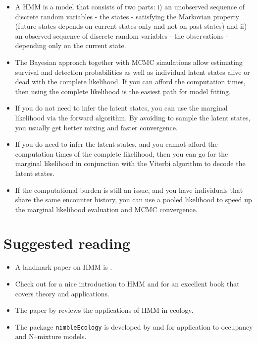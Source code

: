 \documentclass[
  12pt,
]{krantz}
\begin{document}
\begin{itemize}
\item
  A HMM is a model that consists of two parts: i) an unobserved sequence of discrete random variables - the states - satisfying the Markovian property (future states depends on current states only and not on past states) and ii) an observed sequence of discrete random variables - the observations - depending only on the current state.
\item
  The Bayesian approach together with MCMC simulations allow estimating survival and detection probabilities as well as individual latent states alive or dead with the complete likelihood. If you can afford the computation times, then using the complete likelihood is the easiest path for model fitting.
\item
  If you do not need to infer the latent states, you can use the marginal likelihood via the forward algorithm. By avoiding to sample the latent states, you usually get better mixing and faster convergence.
\item
  If you do need to infer the latent states, and you cannot afford the computation times of the complete likelihood, then you can go for the marginal likelihood in conjunction with the Viterbi algorithm to decode the latent states.
\item
  If the computational burden is still an issue, and you have individuals that share the same encounter history, you can use a pooled likelihood to speed up the marginal likelihood evaluation and MCMC convergence.
\end{itemize}

\section{Suggested reading}\label{suggested-reading-2}

\begin{itemize}
\item
  A landmark paper on HMM is \citet{Rabiner1989}.
\item
  Check out \citet{JurafskySpeechAL} for a nice introduction to HMM and \citet{ZucchiniEtAl2016} for an excellent book that covers theory and applications.
\item
  The paper by \citet{mcclintock_uncovering_2020} reviews the applications of HMM in ecology.
\item
  The package \texttt{nimbleEcology} is developed by \citet{goldstein2019nimbleecology} and \citet{ponisio2020customizing} for application to occupancy and N--mixture models.
\end{itemize}
\end{document}
